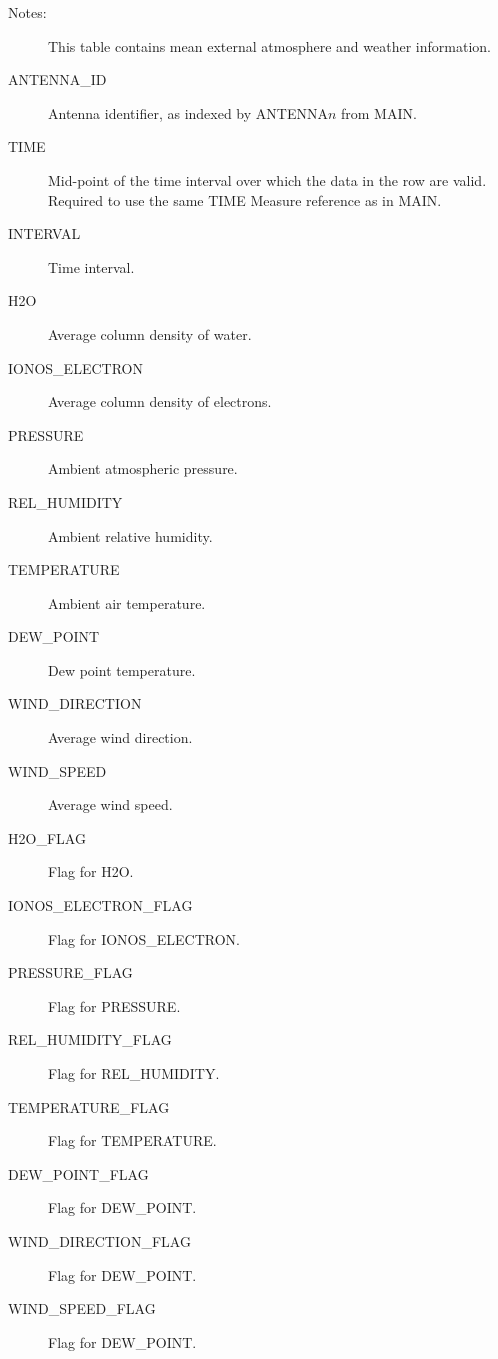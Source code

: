 \documentclass{article}
\begin{document}
\begin{itemize}
\begin{description}
\item[Notes:] This table contains mean external atmosphere and weather
information.

\item[ANTENNA\_ID] Antenna identifier, as indexed by ANTENNA$n$ from MAIN.

\item[TIME] Mid-point of the time interval over which the data in the
row are valid. Required to use the same TIME Measure reference as in
MAIN.

\item[INTERVAL] Time interval.

\item[H2O] Average column density of water.

\item[IONOS\_ELECTRON] Average column density of electrons.

\item[PRESSURE] Ambient atmospheric pressure.

\item[REL\_HUMIDITY] Ambient relative humidity.

\item[TEMPERATURE] Ambient air temperature.

\item[DEW\_POINT] Dew point temperature.

\item[WIND\_DIRECTION] Average wind direction.

\item[WIND\_SPEED] Average wind speed.

\item[H2O\_FLAG] Flag for H2O.

\item[IONOS\_ELECTRON\_FLAG] Flag for IONOS\_ELECTRON.

\item[PRESSURE\_FLAG] Flag for PRESSURE.

\item[REL\_HUMIDITY\_FLAG] Flag for REL\_HUMIDITY.

\item[TEMPERATURE\_FLAG] Flag for TEMPERATURE.

\item[DEW\_POINT\_FLAG] Flag for DEW\_POINT.

\item[WIND\_DIRECTION\_FLAG] Flag for DEW\_POINT.

\item[WIND\_SPEED\_FLAG] Flag for DEW\_POINT.


\end{description}
\end{itemize}
\end{document}
